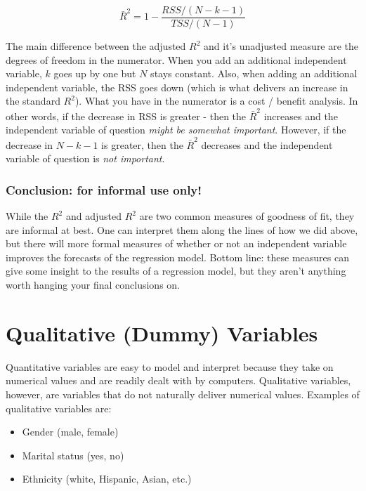 \documentclass[
]{book}
\begin{document}
\[\bar{R}^2 = 1 - \frac{RSS/(N-k-1)}{TSS/(N-1)}\]

The main difference between the adjusted \(R^2\) and it's unadjusted measure are the degrees of freedom in the numerator. When you add an additional independent variable, \(k\) goes up by one but \(N\) stays constant. Also, when adding an additional independent variable, the RSS goes down (which is what delivers an increase in the standard \(R^2\)). What you have in the numerator is a cost / benefit analysis. In other words, if the decrease in RSS is greater - then the \(\bar{R}^2\) increases and the independent variable of question \emph{might be somewhat important}. However, if the decrease in \(N-k-1\) is greater, then the \(\bar{R}^2\) decreases and the independent variable of question is \emph{not important}.

\hypertarget{conclusion-for-informal-use-only}{%
\subsubsection*{Conclusion: for informal use only!}\label{conclusion-for-informal-use-only}}

While the \(R^2\) and adjusted \(R^2\) are two common measures of goodness of fit, they are informal at best. One can interpret them along the lines of how we did above, but there will more formal measures of whether or not an independent variable improves the forecasts of the regression model. Bottom line: these measures can give some insight to the results of a regression model, but they aren't anything worth hanging your final conclusions on.

\hypertarget{qualitative-dummy-variables}{%
\section{Qualitative (Dummy) Variables}\label{qualitative-dummy-variables}}

Quantitative variables are easy to model and interpret because they take on numerical values and are readily dealt with by computers. Qualitative variables, however, are variables that do not naturally deliver numerical values. Examples of qualitative variables are:

\begin{itemize}
\item
  Gender (male, female)
\item
  Marital status (yes, no)
\item
  Ethnicity (white, Hispanic, Asian, etc.)
\end{itemize}
\end{document}
